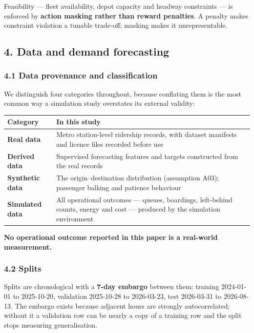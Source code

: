 \documentclass[
]{article}
\begin{document}
Feasibility --- fleet availability, depot capacity and headway
constraints --- is enforced by \textbf{action masking rather than reward
penalties}. A penalty makes constraint violation a tunable trade-off;
masking makes it unrepresentable.

\subsection{4. Data and demand
forecasting}\label{4-data-and-demand-forecasting}

\subsubsection{4.1 Data provenance and
classification}\label{41-data-provenance-and-classification}

We distinguish four categories throughout, because conflating them is
the most common way a simulation study overstates its external validity:

\begin{longtable}[]{@{}ll@{}}
\toprule\noalign{}
Category & In this study \\
\midrule\noalign{}
\endhead
\bottomrule\noalign{}
\endlastfoot
\textbf{Real data} & Metro station-level ridership records, with dataset
manifests and licence files recorded before use \\
\textbf{Derived data} & Supervised forecasting features and targets
constructed from the real records \\
\textbf{Synthetic data} & The origin--destination distribution
(assumption A03); passenger balking and patience behaviour \\
\textbf{Simulated data} & All operational outcomes --- queues,
boardings, left-behind counts, energy and cost --- produced by the
simulation environment \\
\end{longtable}

\textbf{No operational outcome reported in this paper is a real-world
measurement.}

\subsubsection{4.2 Splits}\label{42-splits}

Splits are chronological with a \textbf{7-day embargo} between them:
training 2024-01-01 to 2025-10-20, validation 2025-10-28 to 2026-03-23,
test 2026-03-31 to 2026-08-13. The embargo exists because adjacent hours
are strongly autocorrelated; without it a validation row can be nearly a
copy of a training row and the split stops measuring generalisation.
\end{document}
